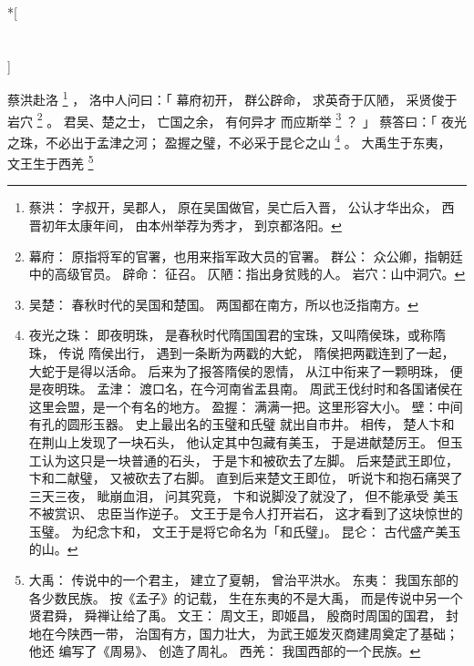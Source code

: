 
\switchcolumn[0]*[\section{}]

蔡洪赴洛%
\footnote{%
    蔡洪：
        字叔开，吴郡人，
        原在吴国做官，吴亡后入晋，
        公认才华出众，
        西晋初年太康年间，
        由本州举荐为秀才，
        到京都洛阳。
}%
，
洛中人问曰：「
    幕府初开，
    群公辟命，
    求英奇于仄陋，
    采贤俊于岩穴%
    \footnote{%
        幕府：
            原指将军的官署，也用来指军政大员的官署。
        群公：
            众公卿，指朝廷中的高级官员。
        辟命：
            征召。
        仄陋：指出身贫贱的人。
        岩穴：山中洞穴。
    }%
    。
    君吴、楚之士，
    亡国之余，
    有何异才
    而应斯举%
    \footnote{%
        吴楚：
            春秋时代的吴国和楚国。
            两国都在南方，所以也泛指南方。
    }%
    ？
」
蔡答曰：「
    夜光之珠，不必出于孟津之河；
    盈握之璧，不必采于昆仑之山%
    \footnote{%
        夜光之珠：
            即夜明珠，
            是春秋时代隋国国君的宝珠，又叫隋侯珠，或称隋珠，
            传说
            隋侯出行，
            遇到一条断为两戳的大蛇，
            隋侯把两戳连到了一起，
            大蛇于是得以活命。
            后来为了报答隋侯的恩情，
            从江中衔来了一颗明珠，
            便是夜明珠。
        孟津：
            渡口名，在今河南省盂县南。
            周武王伐纣时和各国诸侯在这里会盟，是一个有名的地方。
        盈握：
            满满一把。这里形容大小。
        壁：中间有孔的圆形玉器。
            史上最出名的玉璧和氏璧
            就出自市井。
            相传，
            楚人卞和在荆山上发现了一块石头，
            他认定其中包藏有美玉，
            于是进献楚厉王。
            但玉工认为这只是一块普通的石头，
            于是卞和被砍去了左脚。
            后来楚武王即位，
            卞和二献璧，
            又被砍去了右脚。
            直到后来楚文王即位，
            听说卞和抱石痛哭了三天三夜，
            眦崩血泪，
            问其究竟，
            卞和说脚没了就没了，
            但不能承受
            美玉不被赏识、
            忠臣当作逆子。
            文王于是令人打开岩石，
            这才看到了这块惊世的玉璧。
            为纪念卞和，
            文王于是将它命名为「和氏璧」。
        昆仑：
            古代盛产美玉的山。
    }%
    。
    大禹生于东夷，
    文王生于西羌%
    \footnote{%
        大禹：
            传说中的一个君主，
            建立了夏朝，
            曾治平洪水。
        东夷：
            我国东部的各少数民族。
            按《孟子》的记载，
            生在东夷的不是大禹，
            而是传说中另一个贤君舜，
            舜禅让给了禹。
        文王：
            周文王，即姬昌，
            殷商时周国的国君，
            封地在今陕西一带，
            治国有方，国力壮大，
            为武王姬发灭商建周奠定了基础；
            他还
                编写了《周易》、
                创造了周礼。
        西羌：
            我国西部的一个民族。
    }%
